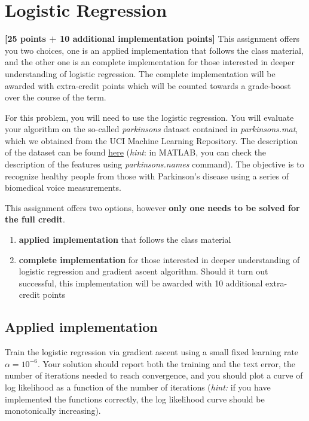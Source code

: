 \documentclass[12pt]{article}
\newenvironment{problem}[2][Problem:]{\begin{trivlist}
\item[\hskip \labelsep {\bfseries #1}\hskip \labelsep {\bfseries #2.}]}{\end{trivlist}}
\begin{document}
\pagebreak

\section{Logistic Regression} 
\textbf{[25 points + 10 additional implementation points]} 
This assignment offers you two choices, one is an applied implementation that follows the class material, and the other one is an complete implementation for those interested in deeper understanding of logistic regression. The complete implementation will be awarded with extra-credit points which will be counted towards a grade-boost over the course of the term. 

For this problem, you will need to use the logistic regression.
You will evaluate your algorithm on the so-called \textit{parkinsons} dataset contained in \textit{parkinsons.mat}, which we
obtained from the UCI Machine Learning Repository. The description of the dataset can be found \href{https://archive.ics.uci.edu/ml/datasets/parkinsons+telemonitoring}{here} (\textit{hint}: in MATLAB, you can check the description of the features using \textit{parkinsons.names} command). The objective is to recognize healthy people from those with Parkinson's disease using a series of biomedical voice measurements.

This assignment offers two options, however \textbf{only one needs to be solved for the full credit}.
\begin{enumerate}
\item \textbf{applied implementation} that follows the class material
\item \textbf{complete implementation} for those interested in deeper understanding of logistic regression and gradient ascent algorithm. Should it turn out successful, this implementation will be awarded with 10 additional extra-credit points
\end{enumerate}


\subsection{Applied implementation}
\begin{problem}{Programming: Naive Logistic Regression [13 points]}
Train the logistic regression via gradient ascent using a small fixed learning rate $\alpha = 10^{-6}$. Your solution should report both the training and the text error, the number of iterations needed to reach convergence, and you should plot a curve of log likelihood as a function of the number of iterations (\textit{hint:} if you have implemented the functions correctly, the log likelihood curve should be monotonically increasing).
\end{problem}
\end{document}
